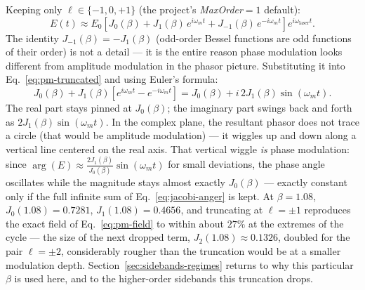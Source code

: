 \documentclass[9pt]{article}
\begin{document}
Keeping only $\ell\in\{-1,0,+1\}$ (the project's \textit{MaxOrder}$=1$ default):
\begin{equation}
E(t) \approx E_0\left[J_0(\beta) + J_1(\beta)\,e^{i\omega_m t} + J_{-1}(\beta)\,e^{-i\omega_m t}\right]e^{i\omega_{\mathrm{laser}} t}.
\label{eq:pm-truncated}
\end{equation}
The identity $J_{-1}(\beta) = -J_1(\beta)$ (odd-order Bessel functions are odd
functions of their order) is not a detail --- it is the entire reason phase
modulation looks different from amplitude modulation in the phasor picture.
Substituting it into Eq.~\eqref{eq:pm-truncated} and using Euler's formula:
\begin{equation}
J_0(\beta) + J_1(\beta)\left[e^{i\omega_m t} - e^{-i\omega_m t}\right]
= J_0(\beta) + i\, 2 J_1(\beta) \sin(\omega_m t).
\label{eq:pm-real-imag}
\end{equation}
The real part stays pinned at $J_0(\beta)$; the imaginary part swings back
and forth as $2J_1(\beta)\sin(\omega_m t)$. In the complex plane, the
resultant phasor does not trace a circle (that would be amplitude
modulation) --- it wiggles up and down along a vertical line centered on the
real axis. That vertical wiggle \emph{is} phase modulation: since
$\arg(E) \approx \frac{2J_1(\beta)}{J_0(\beta)}\sin(\omega_m t)$ for small
deviations, the phase angle oscillates while the magnitude stays almost
exactly $J_0(\beta)$ --- exactly constant only if the full infinite sum of
Eq.~\eqref{eq:jacobi-anger} is kept. At $\beta=1.08$, $J_0(1.08)=0.7281$,
$J_1(1.08)=0.4656$, and truncating at $\ell=\pm1$ reproduces the exact field
of Eq.~\eqref{eq:pm-field} to within about $27\%$ at the extremes of the
cycle --- the size of the next dropped term, $J_2(1.08)\approx0.1326$,
doubled for the pair $\ell=\pm2$, considerably rougher than the truncation
would be at a smaller modulation depth. Section~\ref{sec:sidebands-regimes}
returns to why this particular $\beta$ is used here, and to the
higher-order sidebands this truncation drops.
\end{document}
